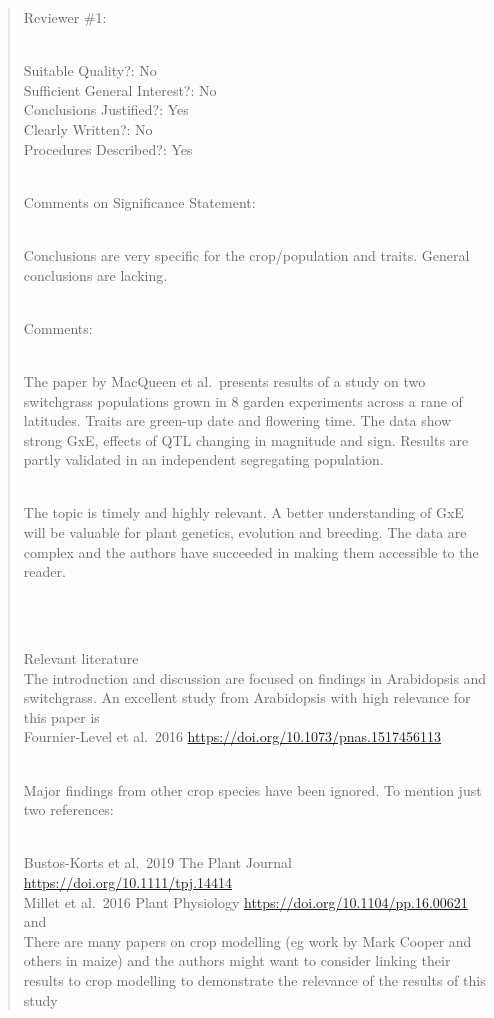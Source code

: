 \documentclass[
  letterpaper,
  DIV=11,
  numbers=noendperiod]{scrartcl}
\begin{document}
\begin{quote}
\begin{tcolorbox}[enhanced jigsaw, rightrule=.15mm, colframe=quarto-callout-warning-color-frame, leftrule=.75mm, arc=.35mm, colback=white, opacityback=0, left=2mm, breakable, toprule=.15mm, bottomrule=.15mm]

Reviewer \#1:\\
\strut \\
Suitable Quality?: No\\
Sufficient General Interest?: No\\
Conclusions Justified?: Yes\\
Clearly Written?: No\\
Procedures Described?: Yes\\
\strut \\
Comments on Significance Statement:\\
\strut \\
Conclusions are very specific for the crop/population and traits.
General conclusions are lacking.\\
\strut \\
Comments:\\
\strut \\
The paper by MacQueen et al.~presents results of a study on two
switchgrass populations grown in 8 garden experiments across a rane of
latitudes. Traits are green-up date and flowering time. The data show
strong GxE, effects of QTL changing in magnitude and sign. Results are
partly validated in an independent segregating population.\\
\strut \\
The topic is timely and highly relevant. A better understanding of GxE
will be valuable for plant genetics, evolution and breeding. The data
are complex and the authors have succeeded in making them accessible to
the reader.\\
\strut \\
\strut \\
Relevant literature\\
The introduction and discussion are focused on findings in Arabidopsis
and switchgrass. An excellent study from Arabidopsis with high relevance
for this paper is\\
Fournier-Level et al.~2016
\url{https://doi.org/10.1073/pnas.1517456113}\\
\strut \\
Major findings from other crop species have been ignored. To mention
just two references:\\
\strut \\
Bustos-Korts et al.~2019 The Plant Journal
\url{https://doi.org/10.1111/tpj.14414}\\
Millet et al.~2016 Plant Physiology
\url{https://doi.org/10.1104/pp.16.00621} and\\
There are many papers on crop modelling (eg work by Mark Cooper and
others in maize) and the authors might want to consider linking their
results to crop modelling to demonstrate the relevance of the results of
this study

\end{tcolorbox}
\end{quote}
\end{document}
